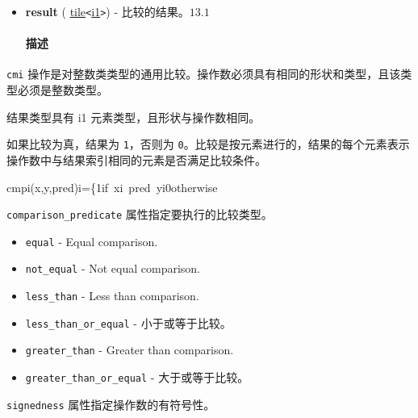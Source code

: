 \documentclass{article}
\begin{document}
\begin{itemize}
\paragraph{结果}

\item \textbf{result} ( \href{https://docs.nvidia.com/cuda/tile-ir/latest/sections/types.html#type-tile}{tile}\texttt{<}\href{https://docs.nvidia.com/cuda/tile-ir/latest/sections/types.html#subsection-element-types}{i1}\texttt{>}) - 比较的结果。$\boxed{13.1}$


\paragraph{描述}

\end{itemize}
\texttt{cmi} 操作是对整数类类型的通用比较。操作数必须具有相同的形状和类型，且该类型必须是整数类型。

结果类型具有 i1 元素类型，且形状与操作数相同。


如果比较为真，结果为 \texttt{1}，否则为 \texttt{0}。比较是按元素进行的，结果的每个元素表示操作数中与结果索引相同的元素是否满足比较条件。


cmpi(x,y,pred)i=\{1if xi pred yi0otherwise

\texttt{comparison\_predicate} 属性指定要执行的比较类型。


\begin{itemize}
\item \texttt{equal} - Equal comparison.
\item \texttt{not\_equal} - Not equal comparison.
\item \texttt{less\_than} - Less than comparison.
\item \texttt{less\_than\_or\_equal} - 小于或等于比较。
\item \texttt{greater\_than} - Greater than comparison.
\item \texttt{greater\_than\_or\_equal} - 大于或等于比较。

\end{itemize}
\texttt{signedness} 属性指定操作数的有符号性。
\end{document}
